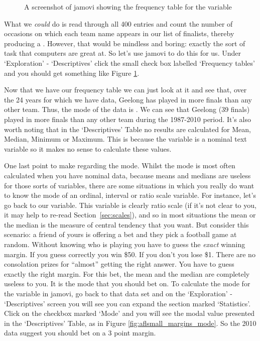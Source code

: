 \begin{figure}[!!htp]
\begin{center}
\caption{A screenshot of jamovi showing the frequency table for the  variable }
\label{fig:aflsmall_finalists_mode}
\HR
\end{center}
\end{figure}

What we {\it could} do is read through all 400 entries and count the number of occasions on which each team name appears in our list of finalists, thereby producing a . However, that would be mindless and boring: exactly the sort of task that computers are great at. So let's use jamovi to do this for us. Under `Exploration' - `Descriptives' click the small check box labelled `Frequency tables' and you should get something like Figure \ref{fig:aflsmall_finalists_mode}. 

Now that we have our frequency table we can just look at it and see that, over the 24 years for which we have data, Geelong has played in more finals than any other team. Thus, the mode of the  data is . We can see that Geelong (39 finals) played in more finals than any other team during the 1987-2010 period. It's also worth noting that in the `Descriptives' Table no results are calculated for Mean, Median, Minimum or Maximum. This is because the  variable is a nominal text variable so it makes no sense to calculate these values.

One last point to make regarding the mode. Whilst the mode is most often calculated when you have nominal data, because means and medians are useless for those sorts of variables, there are some situations in which you really do want to know the mode of an ordinal, interval or ratio scale variable. For instance, let's go back to our  variable. This variable is clearly ratio scale (if it's not clear to you, it may help to re-read Section~\ref{sec:scales}), and so in most situations the mean or the median is the measure of central tendency that you want. But consider this scenario: a friend of yours is offering a bet and they pick a football game at random. Without knowing who is playing you have to guess the {\it exact} winning margin. If you guess correctly you win \$50. If you don't you lose \$1. There are no consolation prizes for ``almost'' getting the right answer. You have to guess exactly the right margin. For this bet, the mean and the median are completely useless to you. It is the mode that you should bet on. To calculate the mode for the  variable in jamovi, go back to that data set and on the `Exploration' - `Descriptives' screen you will see you can expand the section marked `Statistics'. Click on the checkbox marked `Mode' and you will see the modal value presented in the `Descriptives' Table, as in Figure \ref{fig:aflsmall_margins_mode}. So the 2010 data suggest you should bet on a 3 point margin.

